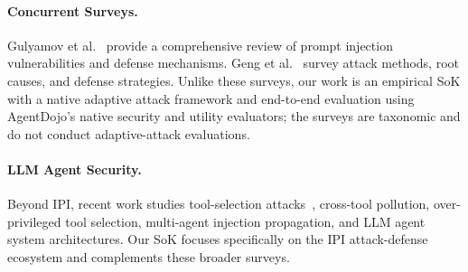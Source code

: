 \paragraph{Concurrent Surveys.}
Gulyamov et al.~\cite{gulyamov2026prompt} provide a comprehensive review of prompt injection vulnerabilities and defense mechanisms. Geng et al.~\cite{geng2025prompt} survey attack methods, root causes, and defense strategies. Unlike these surveys, our work is an empirical SoK with a native adaptive attack framework and end-to-end evaluation using AgentDojo's native security and utility evaluators; the surveys are taxonomic and do not conduct adaptive-attack evaluations.

\paragraph{LLM Agent Security.}
Beyond IPI, recent work studies tool-selection attacks~\cite{shi2025prompt}, cross-tool pollution, over-privileged tool selection, multi-agent injection propagation, and LLM agent system architectures. Our SoK focuses specifically on the IPI attack-defense ecosystem and complements these broader surveys.
